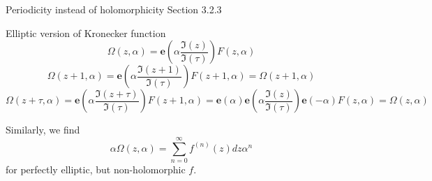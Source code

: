 \documentclass[11pt,aspectratio=169]{beamer}
\newcommand{\ee}[0]{\mathbf{e}}
\begin{document}
\begin{frame}{Periodicity instead of holomorphicity}{\tiny \cite{Broedel_2015} Section 3.2.3}
    \begin{block}{Elliptic version of Kronecker function}
        \[\Omega(z,\alpha) = \ee\left(\alpha \frac{\Im(z)}{\Im(\tau)}\right) F(z,\alpha)\]
        \vspace{+1em}
        \[\Omega(z+1,\alpha) = \ee\left(\alpha \frac{\Im(z+1)}{\Im(\tau)}\right) F(z+1,\alpha) = \Omega(z+1,\alpha)\]
        \[\Omega(z+\tau,\alpha) = \ee\left(\alpha \frac{\Im(z+\tau)}{\Im(\tau)}\right) F(z+1,\alpha) = \ee(\alpha) \ee\left(\alpha \frac{\Im(z)}{\Im(\tau)}\right) \ee(-\alpha) F(z,\alpha) = \Omega(z,\alpha)\]
    \end{block}
    Similarly, we find
    \[ \alpha \Omega(z,\alpha) = \sum_{n=0}^\infty f^{(n)}(z)dz \alpha^n \]
    for perfectly elliptic, but non-holomorphic $f$.

\end{frame}
\end{document}
